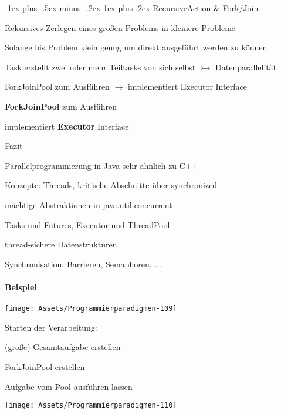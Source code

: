 \documentclass[10pt]{article}
\makeatletter
\renewcommand{\subsubsection}{\@startsection{subsubsection}{3}{0mm}%
                                {-1ex plus -.5ex minus -.2ex}%
                                {1ex plus .2ex}%
                                {\normalfont\small\bfseries}}
\makeatother
\begin{document}
\subsubsection{RecursiveAction \& Fork/Join}
\begin{itemize*}
  \item Rekursives Zerlegen eines großen Problems in kleinere Probleme
  \item Solange bis Problem klein genug um direkt ausgeführt werden zu können
  \item Task erstellt zwei oder mehr Teiltasks von sich selbst $\rightarrowtail$ Datenparallelität
  \item ForkJoinPool zum Ausführen $\rightarrow$ implementiert Executor Interface
  \item \textbf{ForkJoinPool} zum Ausführen
  \begin{itemize*}
    \item implementiert \textbf{Executor} Interface
  \end{itemize*}
  \item Fazit
  \begin{itemize*}
    \item Parallelprogrammierung in Java sehr ähnlich zu C++
    \item Konzepte: Threads, kritische Abschnitte über synchronized
    \item mächtige Abstraktionen in java.util.concurrent
    \begin{itemize*}
      \item Tasks und Futures, Executor und ThreadPool
      \item thread-sichere Datenstrukturen
      \item Synchronisation: Barrieren, Semaphoren, ...
    \end{itemize*}
  \end{itemize*}
\end{itemize*}

\paragraph{Beispiel}
\begin{center}
  \texttt{[image: Assets/Programmierparadigmen-109]}
\end{center}
Starten der Verarbeitung: 
\begin{enumerate*}
  \item (große) Gesamtaufgabe erstellen
  \item ForkJoinPool erstellen
  \item Aufgabe vom Pool ausführen lassen
\end{enumerate*}
\begin{center}
  \texttt{[image: Assets/Programmierparadigmen-110]}
\end{center}
\end{document}
